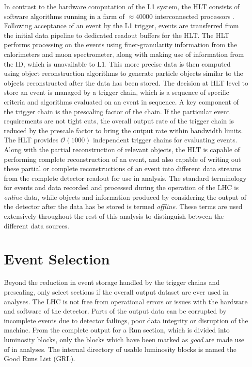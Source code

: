 	In contrast to the hardware computation of the L1 system, the HLT consists of software algorithms running in a farm  of $\approx40000$ interconnected processors \cite{trigrun2017}. Following acceptance of an event by the L1 trigger, events are transferred from the initial data pipeline to dedicated readout buffers for the HLT. The HLT performs processing on the events using finer-granularity information from the calorimeters and muon spectrometer, along with making use of information from the ID, which is unavailable to L1. This more precise data is then computed using object reconstruction algorithms to generate particle objects similar to the objects reconstructed after the data has been stored. The decision at HLT level to store an event is managed by a trigger chain, which is a sequence of specific criteria and algorithms evaluated on an event in sequence. A key component of the trigger chain is the prescaling factor of the chain. If the particular event requirements are not tight cuts, the overall output rate of the trigger chain is reduced by the prescale factor to bring the output rate within bandwidth limits. The HLT provides $\mathcal{O}(1000)$ independent trigger chains for evaluating events. Along with the partial reconstruction of relevant objects, the HLT is capable of performing complete reconstruction of an event, and also capable of writing out these partial or complete reconstructions of an event into different data streams from the complete detector readout for use in analysis. The standard terminology for events and data recorded and processed during the operation of the LHC is \textit{online} data, while objects and information produced by considering the output of the detector after the data has be stored is termed \textit{offline}. These terms are used extensively throughout the rest of this analysis to distinguish between the different data sources.

\section{Event Selection}

	Beyond the reduction in event storage handled by the trigger chains and prescaling, only select sections if the overall output dataset are ever used in analyses. The LHC is not free from operational errors or issues with the hardware and software of the detector. Parts of the output data can be corrupted by incomplete events due to detector failings, poor data integrity or disruption of the machine. From the complete output for a Run section, which is divided into luminosity blocks, only the blocks which have been marked as \textit{good} are made use of in analyses. The internal directory of usable luminosity blocks is named the Good Runs List (GRL).

